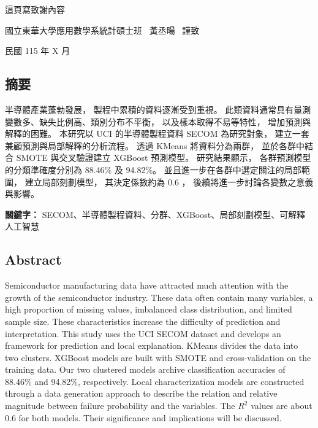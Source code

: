 \documentclass[12pt,a4paper,oneside]{book}
\begin{document}
	這頁寫致謝內容
		
	\vfill
	
	\hfill 國立東華大學應用數學系統計碩士班 \, 黃丞暘 \, 謹致 
	
	\hfill 民國 115 年 X 月
	
	\newpage 
	
	\thispagestyle{empty} 
	\mbox{} 
	\newpage 
	
	\thispagestyle{empty} 
	\begin{center}
		\section*{摘要}
	\end{center}
	
	半導體產業蓬勃發展，
	製程中累積的資料逐漸受到重視。
	此類資料通常具有量測變數多、缺失比例高、類別分布不平衡，
	以及樣本取得不易等特性，
	增加預測與解釋的困難。
	本研究以 UCI 的半導體製程資料 SECOM 為研究對象，
	建立一套兼顧預測與局部解釋的分析流程。
	透過 KMeans 將資料分為兩群，
	並於各群中結合 SMOTE 與交叉驗證建立 XGBoost 預測模型。
	研究結果顯示，
	各群預測模型的分類準確度分別為 88.46\% 及 94.82\%。
	並且進一步在各群中選定關注的局部範圍，
	建立局部刻劃模型，
	其決定係數約為 0.6 ，
	後續將進一步討論各變數之意義與影響。
	

	\vfill
	\textbf{關鍵字：} SECOM、半導體製程資料、分群、XGBoost、局部刻劃模型、可解釋人工智慧
	\newpage 
	
	\thispagestyle{empty} 
	\mbox{} 
	\newpage 
	
	\thispagestyle{empty} 
	\begin{center}
		\section*{Abstract}
	\end{center}
	
	Semiconductor manufacturing data have attracted much attention with the growth of the semiconductor industry.
	These data often contain many variables, 
	a high proportion of missing values, 
	imbalanced class distribution, 
	and limited sample size.
	These characteristics increase the difficulty of prediction and interpretation.
	This study uses the UCI SECOM dataset and develops an framework for prediction and local explanation.
	KMeans divides the data into two clusters.
	XGBoost models are built with SMOTE and cross-validation on the training data.
	Our two clustered models archive classification accuracies of 88.46\% and 94.82\%, respectively.
	Local characterization models are constructed through a data generation approach to describe the relation and relative magnitude between failure probability and the variables.
	The $R^2$ values are about 0.6 for both models.
	Their significance and implications will be discussed.
\end{document}
